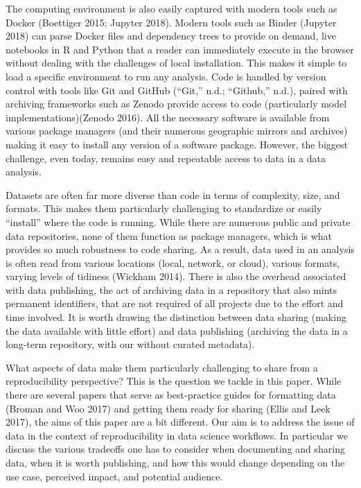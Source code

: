 \documentclass[
]{article}
\begin{document}
The computing environment is also easily captured with modern tools such as Docker (Boettiger 2015; Jupyter 2018). Modern tools such as Binder (Jupyter 2018) can parse Docker files and dependency trees to provide on demand, live notebooks in R and Python that a reader can immediately execute in the browser without dealing with the challenges of local installation. This makes it simple to load a specific environment to run any analysis. Code is handled by version control with tools like Git and GitHub (``Git,'' n.d.; ``Github,'' n.d.), paired with archiving frameworks such as Zenodo provide access to code (particularly model implementations)(Zenodo 2016). All the necessary software is available from various package managers (and their numerous geographic mirrors and archives) making it easy to install any version of a software package. However, the biggest challenge, even today, remains easy and repeatable access to data in a data analysis.

Datasets are often far more diverse than code in terms of complexity, size, and formats. This makes them particularly challenging to standardize or easily ``install'' where the code is running. While there are numerous public and private data repositories, none of them function as package managers, which is what provides so much robustness to code sharing. As a result, data used in an analysis is often read from various locations (local, network, or cloud), various formats, varying levels of tidiness (Wickham 2014). There is also the overhead associated with data publishing, the act of archiving data in a repository that also mints permanent identifiers, that are not required of all projects due to the effort and time involved. It is worth drawing the distinction between data sharing (making the data available with little effort) and data publishing (archiving the data in a long-term repository, with our without curated metadata).

What aspects of data make them particularly challenging to share from a reproducibility perspective? This is the question we tackle in this paper. While there are several papers that serve as best-practice guides for formatting data (Broman and Woo 2017) and getting them ready for sharing (Ellis and Leek 2017), the aims of this paper are a bit different. Our aim is to address the issue of data in the context of reproducibility in data science workflows. In particular we discuss the various tradeoffs one has to consider when documenting and sharing data, when it is worth publishing, and how this would change depending on the use case, perceived impact, and potential audience.
\end{document}
